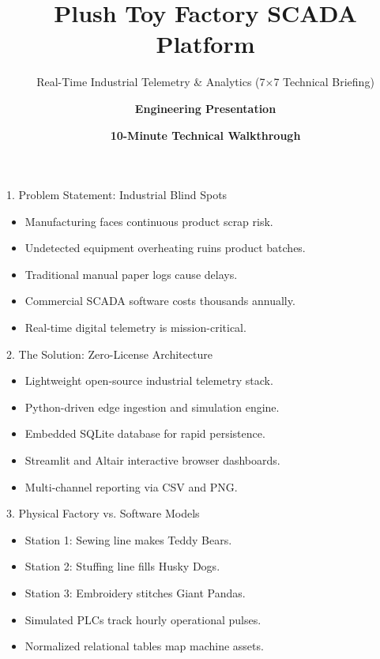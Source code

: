 \documentclass[aspectratio=169,11pt]{beamer}
\title[\textbf{SCADA Platform}]{\textbf{Plush Toy Factory SCADA Platform}}
\subtitle{Real-Time Industrial Telemetry \& Analytics (7$\times$7 Technical Briefing)}
\author[Pineapple Engineering]{\textbf{Engineering Presentation}}
\institute[SWE Team]{\textbf{Software Engineering Division}}
\date{\textbf{10-Minute Technical Walkthrough}}
\begin{document}
\begin{frame}
  \titlepage
\end{frame}

\begin{frame}{1. Problem Statement: Industrial Blind Spots}
  \begin{itemize}\setlength{\itemsep}{0.8em}
    \item Manufacturing faces continuous product scrap risk.
    \item Undetected equipment overheating ruins product batches.
    \item Traditional manual paper logs cause delays.
    \item Commercial SCADA software costs thousands annually.
    \item Real-time digital telemetry is mission-critical.
  \end{itemize}
\end{frame}

\begin{frame}{2. The Solution: Zero-License Architecture}
  \begin{itemize}\setlength{\itemsep}{0.8em}
    \item Lightweight open-source industrial telemetry stack.
    \item Python-driven edge ingestion and simulation engine.
    \item Embedded SQLite database for rapid persistence.
    \item Streamlit and Altair interactive browser dashboards.
    \item Multi-channel reporting via CSV and PNG.
  \end{itemize}
\end{frame}

\begin{frame}{3. Physical Factory vs. Software Models}
  \begin{itemize}\setlength{\itemsep}{0.8em}
    \item Station 1: Sewing line makes Teddy Bears.
    \item Station 2: Stuffing line fills Husky Dogs.
    \item Station 3: Embroidery stitches Giant Pandas.
    \item Simulated PLCs track hourly operational pulses.
    \item Normalized relational tables map machine assets.
  \end{itemize}
\end{frame}
\end{document}
